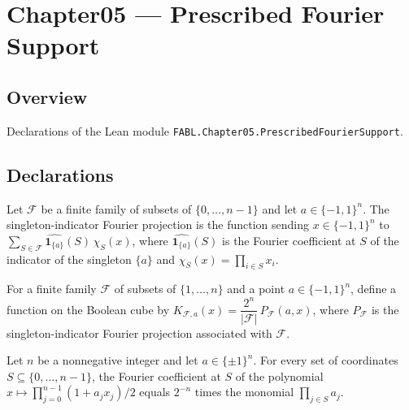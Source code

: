 \chapter{Chapter05 — Prescribed Fourier Support}
\section{Overview}

Declarations of the Lean module \texttt{FABL.Chapter05.PrescribedFourierSupport}.

\section{Declarations}

\begin{definition}
\label{FABL.singletonIndicatorFourierProjection}
\leanok
{}
Let $\mathcal F$ be a finite family of subsets of $\{0,\ldots,n-1\}$ and let
$a\in\{−1,1\}^n$. The singleton-indicator Fourier projection is the function sending
$x\in\{−1,1\}^n$ to $\sum_{S\in\mathcal F}\widehat{\mathbf 1_{\{a\}}}(S)\,\chi_S(x)$,
where $\widehat{\mathbf 1_{\{a\}}}(S)$ is the Fourier coefficient at $S$ of the
indicator of the singleton $\{a\}$ and $\chi_S(x)=\prod_{i\in S}x_i$.
\end{definition}

\begin{definition}
\label{FABL.prescribedFourierKernel}
\leanok
{}
For a finite family $\mathcal F$ of subsets of $\{1,\ldots,n\}$ and a point
$a\in\{-1,1\}^n$, define a function on the Boolean cube by $K_{\mathcal
F,a}(x)=\dfrac{2^n}{|\mathcal F|}\,P_{\mathcal F}(a,x)$, where $P_{\mathcal F}$ is the
singleton-indicator Fourier projection associated with $\mathcal F$.
\end{definition}

\begin{theorem}
\label{FABL.fourierCoeff_indicatorPolynomial}
\leanok
{}
Let $n$ be a nonnegative integer and let $a\in\{\pm1\}^n$. For every set of coordinates
$S\subseteq\{0,\ldots,n-1\}$, the Fourier coefficient at $S$ of the polynomial
$x\mapsto\prod_{j=0}^{n-1}(1+a_jx_j)/2$ equals $2^{-n}$ times the monomial $\prod_{j\in
S}a_j$.
\end{theorem}

